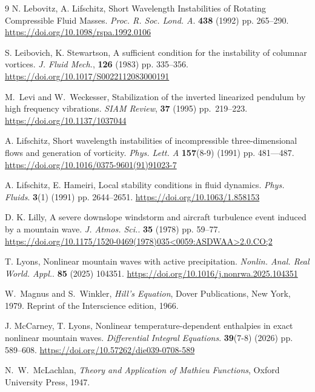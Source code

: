 \documentclass[reqno]{amsart}
\begin{document}
\begin{thebibliography}{9}
N. Lebovitz, A. Lifschitz, Short {W}avelength {I}nstabilities of {R}otating {C}ompressible {F}luid {M}asses. \textit{Proc. R. Soc. Lond. A}. {\bf 438} (1992) pp. 265--290. \url{https://doi.org/10.1098/rspa.1992.0106}




S. Leibovich, K. Stewartson, A sufficient condition for the instability of columnar vortices. \textit{J. Fluid Mech.}, {\bf 126} (1983) pp. 335--356. \url{https://doi.org/10.1017/S0022112083000191}


M.~Levi and W.~Weckesser,
Stabilization of the inverted linearized pendulum by high frequency vibrations.
\textit{SIAM Review},
\textbf{37} (1995) pp.~219--223. \url{https://doi.org/10.1137/1037044}



A. Lifschitz,  Short wavelength instabilities of incompressible three-dimensional flows and generation of vorticity. \textit{Phys. Lett. A} {\bf 157}(8-9) (1991) pp. 481---487.
 \url{https://doi.org/10.1016/0375-9601(91)91023-7}


A. Lifschitz, E. Hameiri, Local stability conditions in fluid dynamics. \textit{Phys. Fluids}. {\bf 3}(1) (1991) pp. 2644--2651. \url{https://doi.org/10.1063/1.858153}


D. K. Lilly, A severe downslope windstorm and aircraft turbulence event induced by a mountain wave. \textit{J. Atmos. Sci.}. {\bf 35} (1978) pp. 59--77. \url{https://doi.org/10.1175/1520-0469(1978)035<0059:ASDWAA>2.0.CO;2}




T. Lyons,  Nonlinear mountain waves with active precipitation. \textit{Nonlin. Anal. Real World. Appl.}. {\bf 85} (2025) 104351. \url{https://doi.org/10.1016/j.nonrwa.2025.104351}


W.~Magnus and S.~Winkler,
\textit{Hill's Equation},
Dover Publications, New York, 1979.
Reprint of the Interscience edition, 1966.




J. McCarney, T. Lyons, Nonlinear temperature-dependent enthalpies in exact nonlinear mountain waves. \textit{Differential Integral Equations}. {\bf 39}(7-8) (2026) pp. 589--608.
 \url{https://doi.org/10.57262/die039-0708-589}

N.~W.~McLachlan,
\textit{Theory and Application of Mathieu Functions},
Oxford University Press, 1947.



\end{thebibliography}
\end{document}
